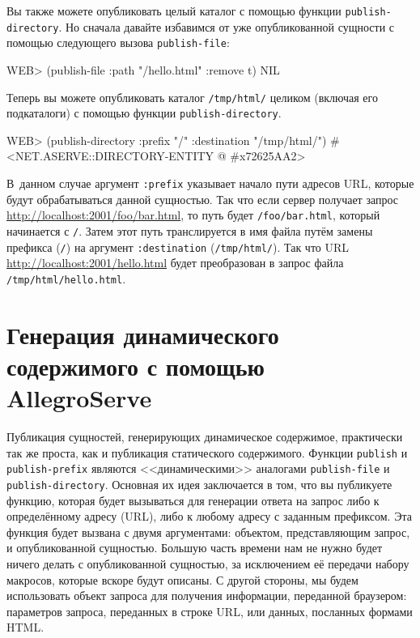Вы также можете опубликовать целый каталог с помощью функции \lstinline{publish-directory}. Но
сначала давайте избавимся от уже опубликованной сущности с помощью следующего вызова
\lstinline{publish-file}:

\begin{myverb}
WEB> (publish-file :path "/hello.html" :remove t)
NIL
\end{myverb}

Теперь вы можете опубликовать каталог \lstinline{/tmp/html/} целиком (включая его подкаталоги)
с помощью функции \lstinline{publish-directory}.

\begin{myverb}
WEB> (publish-directory :prefix "/" :destination "/tmp/html/")
#<NET.ASERVE::DIRECTORY-ENTITY @ #x72625AA2>
\end{myverb}

В~данном случае аргумент \lstinline{:prefix} указывает начало пути адресов URL, которые будут
обрабатываться данной сущностью. Так что если сервер получает запрос
\url{http://localhost:2001/foo/bar.html}, то путь будет \lstinline{/foo/bar.html}, который
начинается с \lstinline{/}. Затем этот путь транслируется в имя файла путём замены префикса
(\lstinline{/}) на аргумент \lstinline{:destination} (\lstinline{/tmp/html/}). Так что URL
\url{http://localhost:2001/hello.html} будет преобразован в запрос файла
\lstinline{/tmp/html/hello.html}.

\section{Генерация динамического содержимого с помощью AllegroServe}

Публикация сущностей, генерирующих динамическое содержимое, практически так же проста, как
и публикация статического содержимого. Функции \lstinline{publish} и \lstinline{publish-prefix}
являются <<динамическими>> аналогами \lstinline{publish-file} и
\lstinline{publish-directory}. Основная их идея заключается в том, что вы публикуете функцию,
которая будет вызываться для генерации ответа на запрос либо к определённому адресу
(URL), либо к любому адресу с заданным префиксом. Эта функция будет вызвана с двумя
аргументами: объектом, представляющим запрос, и опубликованной сущностью. Большую часть
времени нам не нужно будет ничего делать с опубликованной сущностью, за исключением её
передачи набору макросов, которые вскоре будут описаны. С другой стороны, мы будем
использовать объект запроса для получения информации, переданной браузером: параметров
запроса, переданных в строке URL, или данных, посланных формами HTML.

